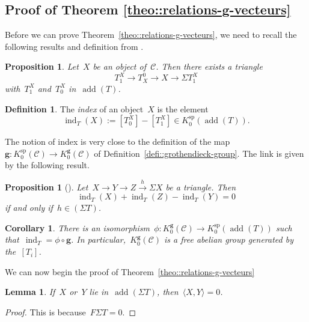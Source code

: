 \documentclass{amsart}
\newtheorem{corollary}[theorem]{Corollary}
\newtheorem{proposition}[theorem]{Proposition}
\newtheorem{lemma}[theorem]{Lemma}
\theoremstyle{definition}
\newtheorem{definition}[theorem]{Definition}
\renewcommand{\b}[1]{{\boldsymbol{#1}}} %
\newcommand{\darkblue}{\color{darkblue}} %
\newcommand{\defn}[1]{\textsl{\darkblue #1}} %
\newcommand{\cat}{\mathcal{C}}
\newcommand{\susp}{\Sigma}
\newcommand{\add}{\operatorname{add}}
\newcommand{\spl}{\operatorname{sp}}
\newcommand{\Ksp}{K_0^{\spl}}
\newcommand{\Kg}{K_0^{\b{g}}}
\newcommand{\ind}{\operatorname{ind}}
\begin{document}

\subsection{Proof of Theorem \ref{theo::relations-g-vecteurs}}

Before we can prove Theorem~\ref{theo::relations-g-vecteurs}, we need to recall the following results and definition from \cite{DehyKeller,Palu}.

\begin{proposition}
 Let~$X$ be an object of~$\cat$. Then there exists a triangle
 \[
  T_1^X \to T^0_X \to X \to \susp T_1^X
 \]
 with~$T_1^X$ and~$T_0^X$ in~$\add(T)$.

\end{proposition}

\begin{definition}
 The \defn{index} of an object~$X$ is the element
 \[
  \ind_T(X) := [T_0^X] - [T_1^X] \in \Ksp(\add(T)).
 \]
\end{definition}

The notion of index is very close to the definition of the map~$\b g:\Ksp(\cat)\to \Kg(\cat)$ of Definition~\ref{defi::grothendieck-group}.  The link is given by the following result.

\begin{proposition}[\cite{Palu}]
 Let~$X\xrightarrow{} Y \xrightarrow{} Z \xrightarrow{h} \susp X$ be a triangle.
 Then
 \[
  \ind_T(X) + \ind_T(Z) - \ind_T(Y) = 0
 \]
 if and only if~$h\in (\susp T)$.
\end{proposition}

\begin{corollary}\label{coro::grothendieck-g-vectors}
 There is an isomorphism~$\phi:\Kg(\cat) \to \Ksp(\add(T))$ such that~$\ind_T = \phi\circ \b g$.  In particular,~$\Kg(\cat)$ is a free abelian group generated by the~$[T_i]$.
\end{corollary}

We can now begin the proof of Theorem~\ref{theo::relations-g-vecteurs}

\begin{lemma}\label{lemm::bilinear-form-suspention-T}
 If~$X$ or~$Y$ lie in~$\add(\susp T)$, then~$\langle X, Y \rangle = 0$.
\end{lemma}
\begin{proof}
 This is because~$F\susp T = 0$.
\end{proof}
\end{document}
